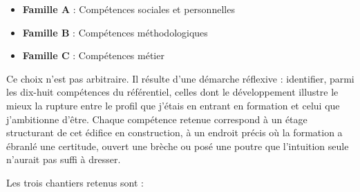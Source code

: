 \begin{itemize}
    \item \textbf{Famille A} : Compétences sociales et personnelles
    \item \textbf{Famille B} : Compétences méthodologiques
    \item \textbf{Famille C} : Compétences métier
\end{itemize}

Ce choix n'est pas arbitraire. Il résulte d'une démarche réflexive : identifier, parmi les dix-huit compétences du référentiel, celles dont le développement illustre le mieux la rupture entre le profil que j'étais en entrant en formation et celui que j'ambitionne d'être. Chaque compétence retenue correspond à un étage structurant de cet édifice en construction, à un endroit précis où la formation a ébranlé une certitude, ouvert une brèche ou posé une poutre que l'intuition seule n'aurait pas suffi à dresser.

Les trois chantiers retenus sont :

